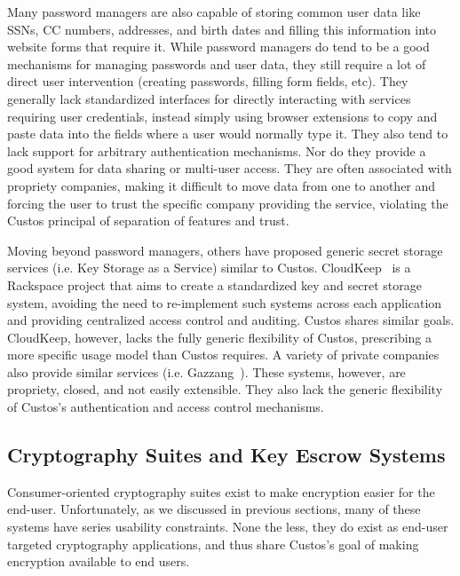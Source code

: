 Many password managers are also capable of storing common user data
like SSNs, CC numbers, addresses, and birth dates and filling this
information into website forms that require it. While password
managers do tend to be a good mechanisms for managing passwords and
user data, they still require a lot of direct user intervention
(creating passwords, filling form fields, etc). They generally lack
standardized interfaces for directly interacting with services
requiring user credentials, instead simply using browser extensions to
copy and paste data into the fields where a user would normally type
it. They also tend to lack support for arbitrary authentication
mechanisms. Nor do they provide a good system for data sharing or
multi-user access. They are often associated with propriety companies,
making it difficult to move data from one to another and forcing the
user to trust the specific company providing the service, violating
the Custos principal of separation of features and trust.

Moving beyond password managers, others have proposed generic secret
storage services (i.e. Key Storage as a Service) similar to Custos.
CloudKeep~\cite{cloudkeep-presentation, cloudkeep} is a Rackspace
project that aims to create a standardized key and secret storage
system, avoiding the need to re-implement such systems across each
application and providing centralized access control and
auditing. Custos shares similar goals. CloudKeep, however, lacks the
fully generic flexibility of Custos, prescribing a more specific usage
model than Custos requires. A variety of private companies also
provide similar services (i.e. Gazzang~\cite{gazzang}). These systems,
however, are propriety, closed, and not easily extensible. They also
lack the generic flexibility of Custos's authentication and access
control mechanisms.

\subsection{Cryptography Suites and Key Escrow Systems}

Consumer-oriented cryptography suites exist to make encryption easier
for the end-user. Unfortunately, as we discussed in previous sections,
many of these systems have series usability constraints. None the
less, they do exist as end-user targeted cryptography applications,
and thus share Custos's goal of making encryption available to end
users.


